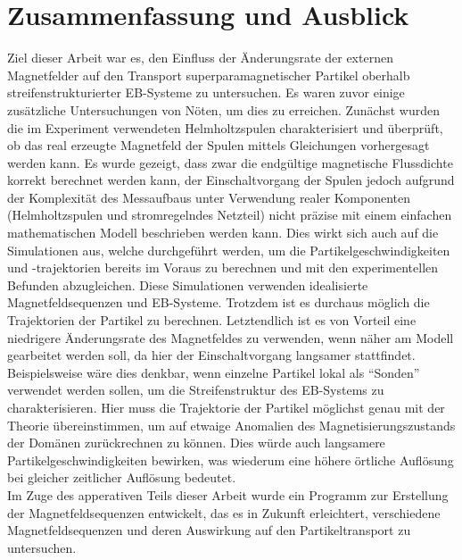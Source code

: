 \documentclass[page,pdftex,12pt,a4paper,twoside,openright]{scrbook}
\begin{document}
\chapter{Zusammenfassung und Ausblick \label{sec-zusammenfassung}}
\label{sec:orgf11b0c5}
Ziel dieser Arbeit war es, den Einfluss der Änderungsrate der externen Magnetfelder auf den Transport superparamagnetischer Partikel oberhalb streifenstrukturierter EB-Systeme zu untersuchen. Es waren zuvor einige zusätzliche Untersuchungen von Nöten, um dies zu erreichen. Zunächst wurden die im Experiment verwendeten Helmholtzspulen charakterisiert und überprüft, ob das real erzeugte Magnetfeld der Spulen mittels Gleichungen vorhergesagt werden kann. Es wurde gezeigt, dass zwar die endgültige magnetische Flussdichte korrekt berechnet werden kann, der Einschaltvorgang der Spulen jedoch aufgrund der Komplexität des Messaufbaus unter Verwendung realer Komponenten (Helmholtzspulen und stromregelndes Netzteil) nicht präzise mit einem einfachen mathematischen Modell beschrieben werden kann. Dies wirkt sich auch auf die Simulationen aus, welche durchgeführt werden, um die Partikelgeschwindigkeiten und -trajektorien bereits im Voraus zu berechnen und mit den experimentellen Befunden abzugleichen. Diese Simulationen verwenden idealisierte Magnetfeldsequenzen und EB-Systeme. Trotzdem ist es durchaus möglich die Trajektorien der Partikel zu berechnen. Letztendlich ist es von Vorteil eine niedrigere Änderungsrate des Magnetfeldes zu verwenden, wenn näher am Modell gearbeitet werden soll, da hier der Einschaltvorgang langsamer stattfindet. Beispielsweise wäre dies denkbar, wenn einzelne Partikel lokal als "`Sonden"' verwendet werden sollen, um die Streifenstruktur des EB-Systems zu charakterisieren. Hier muss die Trajektorie der Partikel möglichst genau mit der Theorie übereinstimmen, um auf etwaige Anomalien des Magnetisierungszustands der Domänen zurückrechnen zu können. Dies würde auch langsamere Partikelgeschwindigkeiten bewirken, was wiederum eine höhere örtliche Auflösung bei gleicher zeitlicher Auflösung bedeutet.\\

Im Zuge des apperativen Teils dieser Arbeit wurde ein Programm zur Erstellung der Magnetfeldsequenzen entwickelt, das es in Zukunft erleichtert, verschiedene Magnetfeldsequenzen und deren Auswirkung auf den Partikeltransport zu untersuchen.\\
\end{document}
